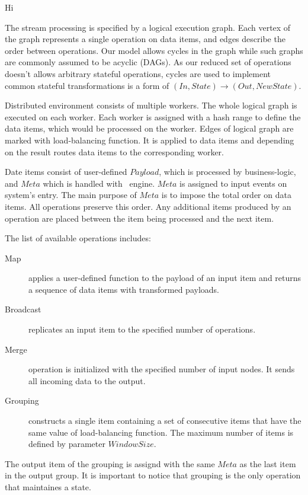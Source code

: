 \newpage
Hi
\newpage
\label {fs-short-model}

The stream processing is specified by a logical execution graph. Each vertex of the graph represents a single operation on data items, and edges describe the order between operations. Our model allows cycles in the graph while such graphs are commonly assumed to be acyclic (DAGs). As our reduced set of operations doesn't allows arbitrary stateful operations, cycles are used to implement common stateful transformations is a form of $(In, State) \rightarrow (Out, NewState)$.

Distributed environment consists of multiple workers. The whole logical graph is executed on each worker. Each worker is assigned with a hash range to define the data items, which would be processed on the worker. Edges of logical graph are marked with load-balancing function. It is applied to data items and depending on the result routes data items to the corresponding worker.

Date items consist of user-defined $Payload$, which is processed by business-logic, and $Meta$ which is handled with \FlameStream\ engine. $Meta$ is assigned to input events on system's entry. The main purpose of $Meta$ is to impose the total order on data items. All operations preserve this order. Any additional items produced by an operation are placed between the item being processed and the next item.

The list of available operations includes:

\begin {description}
  \item [Map] applies a user-defined function to the payload of an input item and returns a sequence of data items with transformed payloads. 
  \item [Broadcast] replicates an input item to the specified number of operations.
  \item [Merge] operation is initialized with the specified number of input nodes. It sends all incoming data to the output.
  \item [Grouping] constructs a single item containing a set of consecutive items that have the same value of load-balancing function. The maximum number of items is defined by parameter $Window Size$. 
\end {description}

The output item of the grouping is assignd with the same $Meta$ as the last item in the output group. It is important to notice that grouping is the only operation that maintaines a state.

